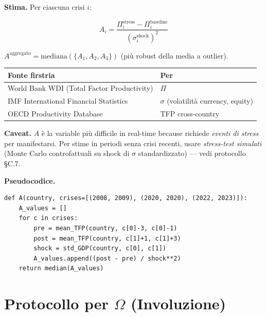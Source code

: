 \Hypoth{} \textbf{Stima.} Per ciascuna crisi \(i\):

\[
A_i = \frac{\Pi^{\text{stress}}_i - \Pi^{\text{baseline}}_i}{(\sigma^{\text{shock}}_i)^2}
\]

\(A^{\text{aggregato}} = \text{mediana}(\{A_1, A_2, A_3\})\) (più
robust della media a outlier).

{\def\LTcaptype{none} %
{\small\begin{longtable}[]{@{}
  >{\raggedright\arraybackslash}p{}
  >{\raggedright\arraybackslash}p{}@{}}
\toprule\noalign{}
\begin{minipage}[b]{\linewidth}\raggedright
Fonte firstria
\end{minipage} & \begin{minipage}[b]{\linewidth}\raggedright
Per
\end{minipage} \\
\midrule\noalign{}
\endhead
\bottomrule\noalign{}
\endlastfoot
World Bank WDI (Total Factor Productivity) & \(\Pi\) \\
IMF International Financial Statistics & \(\sigma\) (volatilità
currency, equity) \\
OECD Productivity Database & TFP cross-country \\
\end{longtable}}
}

\Conj{} \textbf{Caveat.} \(A\) è la variable più difficile in real-time
because richiede \emph{eventi di stress} per manifestarsi. Per stime in
periodi senza crisi recenti, usare \emph{stress-test simulati} (Monte
Carlo controfattuali su shock di \(\sigma\) standardizzato) --- vedi
protocollo \S{}C.7.

\Hypoth{} \textbf{Pseudocodice.}

\begin{verbatim}
def A(country, crises=[(2008, 2009), (2020, 2020), (2022, 2023)]):
    A_values = []
    for c in crises:
        pre = mean_TFP(country, c[0]-3, c[0]-1)
        post = mean_TFP(country, c[1]+1, c[1]+3)
        shock = std_GDP(country, c[0], c[1])
        A_values.append((post - pre) / shock**2)
    return median(A_values)
\end{verbatim}



\section{\texorpdfstring{Protocollo per \(\Omega\)
(Involuzione)}{Protocollo per \textbackslash Omega (Involuzione)}}\label{protocollo-per-omega-involution}

